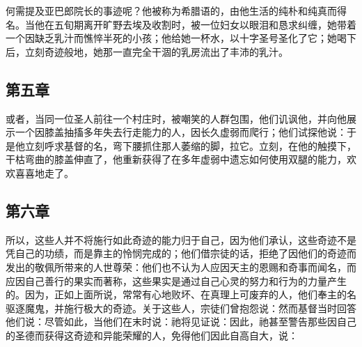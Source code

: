 \par

何需提及亚巴郎院长的事迹呢？他被称为希腊语的，由他生活的纯朴和纯真而得名。当他在五旬期离开旷野去埃及收割时，被一位妇女以眼泪和恳求纠缠，她带着一个因缺乏乳汁而憔悴半死的小孩；他给她一杯水，以十字圣号圣化了它；她喝下后，立刻奇迹般地，她那一直完全干涸的乳房流出了丰沛的乳汁。\par


\subsection{第五章}

\par

或者，当同一位圣人前往一个村庄时，被嘲笑的人群包围，他们讥讽他，并向他展示一个因膝盖抽搐多年失去行走能力的人，因长久虚弱而爬行；他们试探他说：于是他立刻呼求基督的名，弯下腰抓住那人萎缩的脚，拉它。立刻，在他的触摸下，干枯弯曲的膝盖伸直了，他重新获得了在多年虚弱中遗忘如何使用双腿的能力，欢欢喜喜地走了。\par


\subsection{第六章}

\par

所以，这些人并不将施行如此奇迹的能力归于自己，因为他们承认，这些奇迹不是凭自己的功绩，而是靠主的怜悯完成的；他们借宗徒的话，拒绝了因他们的奇迹而发出的敬佩所带来的人世尊荣：他们也不认为人应因天主的恩赐和奇事而闻名，而应因自己善行的果实而著称，这些果实是通过自己心灵的努力和行为的力量产生的。因为，正如上面所说，常常有心地败坏、在真理上可废弃的人，他们奉主的名驱逐魔鬼，并施行极大的奇迹。关于这些人，宗徒们曾抱怨说：然而基督当时回答他们说：尽管如此，当他们在末时说：祂将见证说：因此，祂甚至警告那些因自己的圣德而获得这奇迹和异能荣耀的人，免得他们因此自高自大，说：\par

